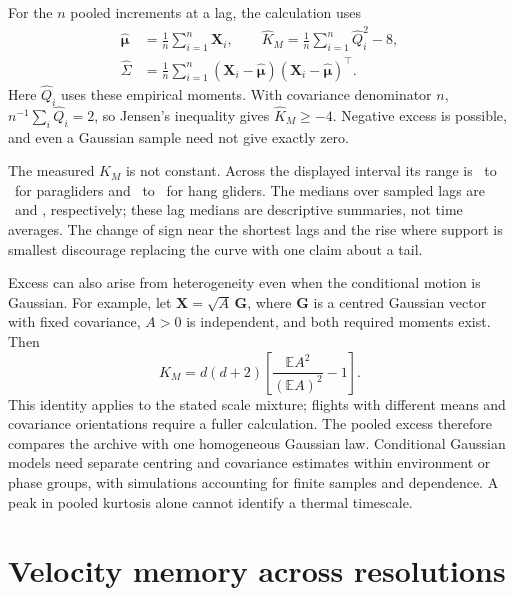 For the $n$ pooled increments at a lag, the calculation uses
\begin{equation}
 \begin{aligned}
 \widehat{\boldsymbol\mu}&=\frac1n\sum_{i=1}^n\mathbf X_i,\qquad
 \widehat K_M=\frac1n\sum_{i=1}^n\widehat Q_i^2-8,
 \\
 \widehat\Sigma&=\frac1n\sum_{i=1}^n
  (\mathbf X_i-\widehat{\boldsymbol\mu})
  (\mathbf X_i-\widehat{\boldsymbol\mu})^\top.
 \end{aligned}
 \label{eq:empirical-mardia}
\end{equation}
Here $\widehat Q_i$ uses these empirical moments. With covariance denominator $n$,
$n^{-1}\sum_i\widehat Q_i=2$, so Jensen's inequality gives
$\widehat K_M\ge-4$. Negative excess is possible, and even a Gaussian sample
need not give exactly zero.

The measured $K_M$ is not constant. Across the displayed interval its range is
\StatRevParaMardiaMin\ to \StatRevParaMardiaMax\ for paragliders and
\StatRevHangMardiaMin\ to \StatRevHangMardiaMax\ for hang gliders. The medians over
sampled lags are \StatRevParaMardiaMedian\ and \StatRevHangMardiaMedian, respectively;
these lag medians are descriptive summaries, not time averages. The change of sign near
the shortest lags and the rise where support is smallest discourage replacing the curve
with one claim about a tail.

Excess can also arise from heterogeneity even when the conditional motion is Gaussian.
For example, let $\mathbf X=\sqrt A\,\mathbf G$, where $\mathbf G$ is a centred Gaussian vector with
fixed covariance, $A>0$ is independent, and both required moments exist. Then
\begin{equation}
  K_M=d(d+2)\left[\frac{\mathbb E A^2}{(\mathbb E A)^2}-1\right].
  \label{eq:pooled-nongauss}
\end{equation}
This identity applies to the stated scale mixture; flights with different means
and covariance orientations require a fuller calculation. The pooled excess
therefore compares the archive with one homogeneous Gaussian law. Conditional
Gaussian models need separate centring and covariance estimates within environment
or phase groups, with simulations accounting for finite samples and dependence.
A peak in pooled kurtosis alone cannot identify a thermal timescale.

\section{Velocity memory across resolutions}
\label{sec:transport-memory}

